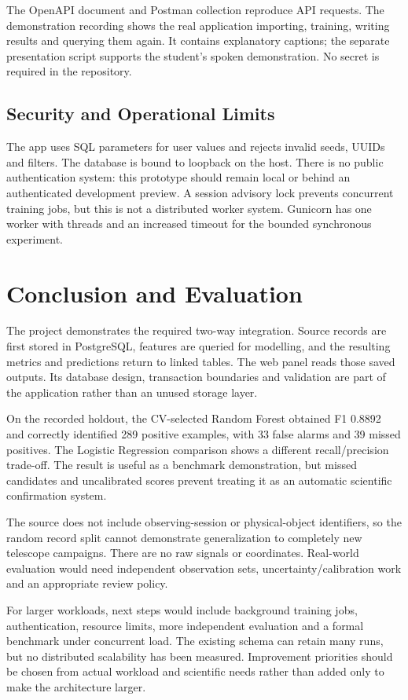 \documentclass[11pt,a4paper]{article}
\begin{document}
The OpenAPI document and Postman collection reproduce API requests. The demonstration recording shows the real application importing, training, writing results and querying them again. It contains explanatory captions; the separate presentation script supports the student's spoken demonstration. No secret is required in the repository.

\subsection{Security and Operational Limits}
The app uses SQL parameters for user values and rejects invalid seeds, UUIDs and filters. The database is bound to loopback on the host. There is no public authentication system: this prototype should remain local or behind an authenticated development preview. A session advisory lock prevents concurrent training jobs, but this is not a distributed worker system. Gunicorn has one worker with threads and an increased timeout for the bounded synchronous experiment.

\newpage
\section{Conclusion and Evaluation}
The project demonstrates the required two-way integration. Source records are first stored in PostgreSQL, features are queried for modelling, and the resulting metrics and predictions return to linked tables. The web panel reads those saved outputs. Its database design, transaction boundaries and validation are part of the application rather than an unused storage layer.

On the recorded holdout, the CV-selected Random Forest obtained F1 0.8892 and correctly identified 289 positive examples, with 33 false alarms and 39 missed positives. The Logistic Regression comparison shows a different recall/precision trade-off. The result is useful as a benchmark demonstration, but missed candidates and uncalibrated scores prevent treating it as an automatic scientific confirmation system.

The source does not include observing-session or physical-object identifiers, so the random record split cannot demonstrate generalization to completely new telescope campaigns. There are no raw signals or coordinates. Real-world evaluation would need independent observation sets, uncertainty/calibration work and an appropriate review policy.

For larger workloads, next steps would include background training jobs, authentication, resource limits, more independent evaluation and a formal benchmark under concurrent load. The existing schema can retain many runs, but no distributed scalability has been measured. Improvement priorities should be chosen from actual workload and scientific needs rather than added only to make the architecture larger.
\end{document}
